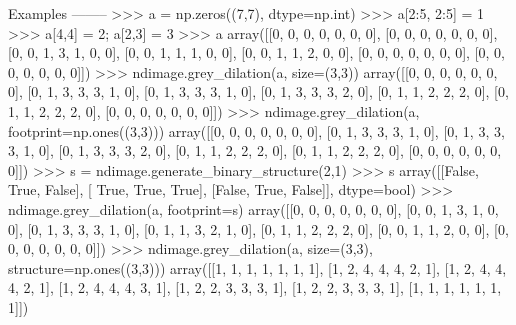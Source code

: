 \begin{DoxyVerb}
Examples
--------
>>> a = np.zeros((7,7), dtype=np.int)
>>> a[2:5, 2:5] = 1
>>> a[4,4] = 2; a[2,3] = 3
>>> a
array([[0, 0, 0, 0, 0, 0, 0],
       [0, 0, 0, 0, 0, 0, 0],
       [0, 0, 1, 3, 1, 0, 0],
       [0, 0, 1, 1, 1, 0, 0],
       [0, 0, 1, 1, 2, 0, 0],
       [0, 0, 0, 0, 0, 0, 0],
       [0, 0, 0, 0, 0, 0, 0]])
>>> ndimage.grey_dilation(a, size=(3,3))
array([[0, 0, 0, 0, 0, 0, 0],
       [0, 1, 3, 3, 3, 1, 0],
       [0, 1, 3, 3, 3, 1, 0],
       [0, 1, 3, 3, 3, 2, 0],
       [0, 1, 1, 2, 2, 2, 0],
       [0, 1, 1, 2, 2, 2, 0],
       [0, 0, 0, 0, 0, 0, 0]])
>>> ndimage.grey_dilation(a, footprint=np.ones((3,3)))
array([[0, 0, 0, 0, 0, 0, 0],
       [0, 1, 3, 3, 3, 1, 0],
       [0, 1, 3, 3, 3, 1, 0],
       [0, 1, 3, 3, 3, 2, 0],
       [0, 1, 1, 2, 2, 2, 0],
       [0, 1, 1, 2, 2, 2, 0],
       [0, 0, 0, 0, 0, 0, 0]])
>>> s = ndimage.generate_binary_structure(2,1)
>>> s
array([[False,  True, False],
       [ True,  True,  True],
       [False,  True, False]], dtype=bool)
>>> ndimage.grey_dilation(a, footprint=s)
array([[0, 0, 0, 0, 0, 0, 0],
       [0, 0, 1, 3, 1, 0, 0],
       [0, 1, 3, 3, 3, 1, 0],
       [0, 1, 1, 3, 2, 1, 0],
       [0, 1, 1, 2, 2, 2, 0],
       [0, 0, 1, 1, 2, 0, 0],
       [0, 0, 0, 0, 0, 0, 0]])
>>> ndimage.grey_dilation(a, size=(3,3), structure=np.ones((3,3)))
array([[1, 1, 1, 1, 1, 1, 1],
       [1, 2, 4, 4, 4, 2, 1],
       [1, 2, 4, 4, 4, 2, 1],
       [1, 2, 4, 4, 4, 3, 1],
       [1, 2, 2, 3, 3, 3, 1],
       [1, 2, 2, 3, 3, 3, 1],
       [1, 1, 1, 1, 1, 1, 1]])\end{DoxyVerb}
 \hypertarget{namespacescipy_1_1ndimage_1_1morphology_aa5a7684ebf91074d01d01a21c8c1e3fe}{}
